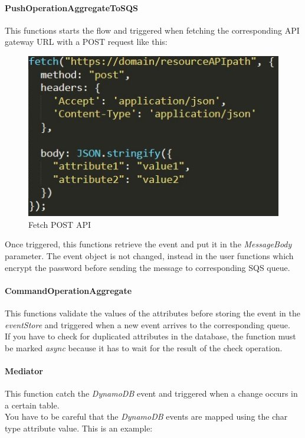 \paragraph{PushOperationAggregateToSQS} \Spazio
This functions starts the flow and triggered when fetching the corresponding API gateway URL with a POST request like this: \\
\begin{figure} [H]
	\centering
	\includegraphics[scale=1.2]{../Img/fetchPOST}
	\caption{Fetch POST API}\label{}
\end{figure}
Once triggered, this functions retrieve the event and put it in the \emph{MessageBody} parameter. The event object is not changed, instead in the user functions which encrypt the password before sending the message to corresponding SQS queue.


\paragraph{CommandOperationAggregate} \Spazio
This functions validate the values of the attributes before storing the event in the \emph{eventStore} and triggered when a new event arrives to the corresponding queue. \\ 
If you have to check for duplicated attributes in the database, the function must be marked \emph{async} because it has to wait for the result of the check operation.

\paragraph{Mediator} \Spazio
This function catch the \emph{DynamoDB} event and triggered when a change occurs in a certain table. \\
You have to be careful that the \emph{DynamoDB} events are mapped using the char type attribute value. This is an example:


